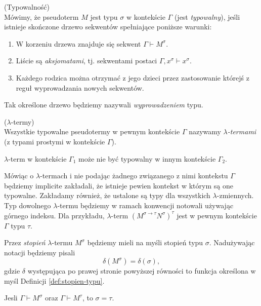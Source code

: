 \begin{definicja}(Typowalność)\\
  Mówimy, że pseudoterm \(M\) jest typu \(\sigma\) w kontekście \(\Gamma\) (jest \emph{typowalny}), jeśli istnieje skończone drzewo sekwentów spełniające poniższe warunki:
  \begin{enumerate}
      \item W korzeniu drzewa znajduje się sekwent \(\Gamma \vdash M^\sigma\).
      \item Liście są \emph{aksjomatami}, tj. sekwentami postaci \(\Gamma, x^\sigma \vdash x^\sigma\).
      \item Każdego rodzica można otrzymać z jego dzieci przez zastosowanie którejś z reguł wyprowadzania nowych sekwentów.
  \end{enumerate}
  Tak określone drzewo będziemy nazywali \emph{wyprowadzeniem} typu.
\end{definicja}
 \begin{definicja}\label{def:lambda-term}(\(\lambda\)-termy)\\ 
   Wszystkie typowalne pseudotermy w pewnym kontekście \(\Gamma\) nazywamy \emph{\(\lambda\)-termami} (z typami prostymi w  kontekście \(\Gamma\)).
  \begin{uwaga*}
    \(\lambda\)-term w kontekście \(\Gamma_1\) może nie być typowalny w innym kontekście \(\Gamma_2\).   
  \end{uwaga*}
\end{definicja}
Mówiąc o \(\lambda\)-termach i nie podając żadnego związanego z nimi kontekstu \(\Gamma\) będziemy implicite zakładali, że istnieje pewien kontekst w którym są one typowalne. Zakładamy również, że ustalone są typy dla wszystkich \(\lambda\)-zmiennych. Typ dowolnego \(\lambda\)-termu będziemy w ramach konwencji notowali używając górnego indeksu. Dla przykładu, \(\lambda\)-term \(\left(M^{\sigma\to\tau}N^\sigma\right)^\tau\) jest w pewnym kontekście \(\Gamma\) typu \(\tau\). 

   Przez \emph{stopień} \(\lambda\)-termu \(M^\sigma\) będziemy mieli na myśli stopień typu \(\sigma\). Nadużywając notacji będziemy pisali
   \[
     \delta(M^\sigma) = \delta(\sigma),
   \]
   gdzie \(\delta\) występująca po prawej stronie powyższej równości to funkcja określona w myśl Definicji \ref{def:stopien-typu}.


  \begin{fakt}
    Jesli \(\Gamma\vdash M^\sigma\) oraz \(\Gamma\vdash M^\tau\), to \(\sigma=\tau\).
  \end{fakt}
